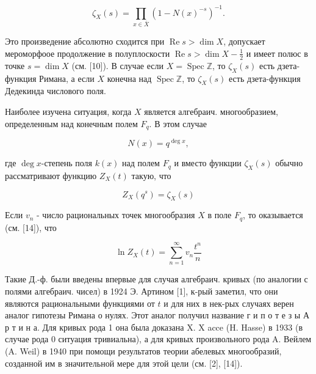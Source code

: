 \documentclass[10pt]{article}
\begin{document}
\[

\zeta_{X}(s)=\prod_{x \in \bar{X}}\left(1-N(x)^{-s}\right)^{-1} .

\]



Это произведение абсолютно сходится при $\operatorname{Re} s>\operatorname{dim} X$, допускает мероморфоое продолжение в полуплоскости $\operatorname{Re} s>\operatorname{dim} X-\frac{1}{2}$ и имеет полюс в точке $s=\operatorname{dim} X$ (см. [10]). В случае если $X=\operatorname{Spec} \mathbb{Z}$, то $\zeta_{X}(s)$ есть дзета-функция Римана, а если $X$ конечна над $\operatorname{Spec} \mathbb{Z}$, то $\zeta_{X}(s)$ есть дзета-функция Дедекинда числового поля.



Наиболее изучена ситуация, когда $X$ является алгебраич. многообразием, определенным над конечным полем $F_{q}$. В этом случае



\[

N(x)=q^{\operatorname{deg} x},

\]



где $\operatorname{deg} x$-степень поля $k(x)$ над полем $F_{q}$ и вместо функции $\zeta_{X}(s)$ обычно рассматривают функцию $Z_{X}(t)$ такую, что



\[

Z_{X}\left(q^{s}\right)=\zeta_{X}(s)

\]



Если $v_{n}$ - число рациональных точек многообразия $X$ в поле $F_{q}$, то оказывается (см. [14]), что



\[

\ln Z_{X}(t)=\sum_{n=1}^{\infty} v_{n} \frac{t^{n}}{n}

\]



Такие Д.-ф. были введены впервые для случая алгебраич. кривых (по аналогии с полями алгебраич. чисел) в 1924 Э. Артином [1], к-рый заметил, что они являются рациональными функциями от $t$ и для них в нек-рых случаях верен аналог гипотезы Римана о нулях. Этот аналог получил название г и п о т е з ы А р т и н а. Для кривых рода 1 она была доказана X. X acce (H. Hasse) в 1933 (в случае рода 0 ситуация тривиальна), а для кривых произвольного рода A. Вейлем (A. Weil) в 1940 при помощи результатов теории абелевых многообразий, созданной им в значительной мере для этой цели (см. [2], [14]).
\end{document}
